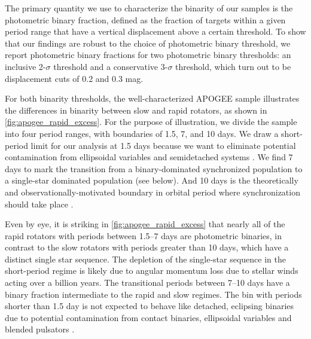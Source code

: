 \documentclass[twocolumn]{aastex6}
\begin{document}
The primary quantity we use to characterize the binarity of our samples is the
photometric binary fraction, defined as the fraction of targets within a given
period range that have a vertical displacement above a certain threshold.
To show that our findings are robust to the choice of photometric
binary threshold, we report photometric binary fractions for two photometric 
binary thresholds: an inclusive 2-\(\sigma\) threshold and a conservative 
3-\(\sigma\) threshold, which turn out to be displacement cuts of 0.2 and 0.3 
mag. 

\begin{figure*}[htb]
    \centering
    \caption{\emph{Top Left to Bottom Right:} Vertical displacement of cool 
        APOGEE targets with \citet{McQuillan14} periods >10 days, between 
        7--10 days, 1.5--7 days, and <1.5 days. Pink stars denote 
        eclipsing binaries with orbital periods within the same ranges. The 
        green and purple lines denote the inclusive and conservative 
        photometric binary thresholds, respectively. The temperatures are from
    APOGEE.}\label{fig:apogee_rapid_excess}
\end{figure*}

For both binarity thresholds, the well-characterized APOGEE sample 
illustrates the differences in binarity between slow and rapid rotators, as
shown in \cref{fig:apogee_rapid_excess}. For
the purpose of illustration, we divide the sample into four period ranges, with
boundaries of 1.5, 7, and 10 days. We draw a short-period limit for our analysis 
at 1.5 days because we want to eliminate potential contamination from 
ellipsoidal variables and semidetached systems \citep{VanEylen16}. We find 7 
days to mark the transition from a binary-dominated synchronized population to 
a single-star dominated population (see below). And 10 days is the 
theoretically and observationally-motivated boundary in orbital period where 
synchronization should take place \citep{Claret97,Lurie17}.

Even by eye, it is striking in \cref{fig:apogee_rapid_excess} that nearly all 
of the rapid rotators with periods between 1.5--7 days are photometric 
binaries, in contrast to the slow rotators with periods greater than 10 days, 
which have a distinct single star sequence.  The depletion of the single-star 
sequence in the short-period regime is likely due to angular momentum loss due 
to stellar winds acting over a billion years. The transitional periods between 
7--10 days have a binary fraction intermediate to the rapid and slow regimes. 
The bin with periods shorter than 1.5 day is not expected to behave like 
detached, eclipsing binaries due to potential contamination from contact 
binaries, ellipsoidal variables and blended pulsators \citep{VanEylen16}. 
\end{document}
